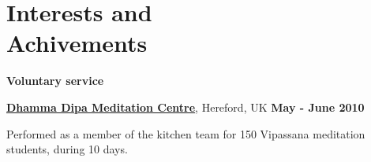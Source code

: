 %
% 
% 

% 

\section{Interests and \\ Achivements}
%
% 
% 
% 
%
\textbf{Voluntary service}

\begin{outerlist}
\item[\FA \faAngleDoubleRight] \href{http://www.dipa.dhamma.org/}{\textbf{Dhamma
Dipa Meditation Centre}}, Hereford, UK%
        \hfill \textbf{May - June 2010}
\end{outerlist}

\begin{innerlist}
\item Performed as a member of the kitchen team for 150 Vipassana meditation
students, during 10 days.
\end{innerlist}

% 

